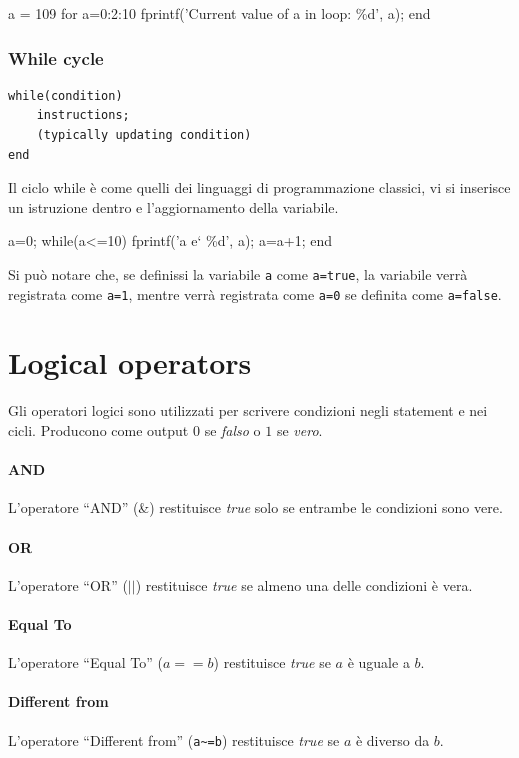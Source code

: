 \bigskip
\begin{matlab}
a = 109
for a=0:2:10
    fprintf('Current value of a in loop: \%d\n', a);
end
\end{matlab}

\subsubsection{While cycle}
\begin{verbatim}
while(condition)
    instructions;
    (typically updating condition)
end
\end{verbatim}
Il ciclo while è come quelli dei linguaggi di programmazione classici, vi si inserisce un istruzione dentro e l'aggiornamento della variabile.
\begin{matlab}
a=0;
while(a<=10)
    fprintf('a e` \%d\n', a);
    a=a+1;
end
\end{matlab}

\begin{note}
Si può notare che, se definissi la variabile \verb|a| come \verb|a=true|, la variabile verrà registrata come \verb|a=1|, mentre verrà registrata come \verb|a=0| se definita come \verb|a=false|.
\end{note}

\section{Logical operators}
Gli operatori logici sono utilizzati per scrivere condizioni negli statement e nei cicli. Producono come output $ 0 $  se \emph{falso} o $ 1 $ se \emph{vero}.
\paragraph{AND} L'operatore ``AND'' (\&) restituisce \emph{true} solo se entrambe le condizioni sono vere.
\paragraph{OR} L'operatore ``OR'' ($ || $) restituisce \emph{true} se almeno una delle condizioni è vera.
\paragraph{Equal To} L'operatore ``Equal To'' ($ a==b $) restituisce \emph{true} se $ a $ è uguale a $ b $.
\paragraph{Different from} L'operatore ``Different from'' (\verb|a~=b|) restituisce \emph{true} se $ a $ è diverso da $ b $.
